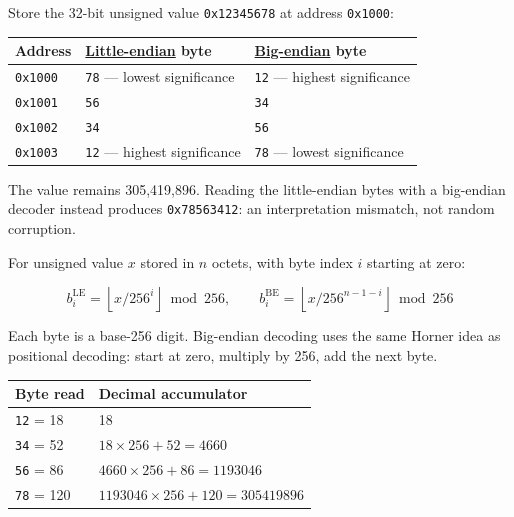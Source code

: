 Store the 32-bit unsigned value \texttt{0x12345678} at address \texttt{0x1000}:

{\def\LTcaptype{none} %
\begin{longtable}[]{@{}
  >{\raggedright\arraybackslash}p{}
  >{\raggedright\arraybackslash}p{}
  >{\raggedright\arraybackslash}p{}@{}}
\toprule\noalign{}
\begin{minipage}[b]{\linewidth}\raggedright
Address
\end{minipage} & \begin{minipage}[b]{\linewidth}\raggedright
\hyperref[appendix-367b6abf460e]{Little-endian} byte
\end{minipage} & \begin{minipage}[b]{\linewidth}\raggedright
\hyperref[appendix-92e040df969a]{Big-endian} byte
\end{minipage} \\
\midrule\noalign{}
\endhead
\bottomrule\noalign{}
\endlastfoot
\texttt{0x1000} & \texttt{78} --- lowest significance & \texttt{12} --- highest significance \\
\texttt{0x1001} & \texttt{56} & \texttt{34} \\
\texttt{0x1002} & \texttt{34} & \texttt{56} \\
\texttt{0x1003} & \texttt{12} --- highest significance & \texttt{78} --- lowest significance \\
\end{longtable}
}

The value remains 305,419,896. Reading the little-endian bytes with a big-endian decoder instead produces \texttt{0x78563412}: an interpretation mismatch, not random corruption.

For unsigned value \(x\) stored in \(n\) octets, with byte index \(i\) starting at zero:

\[
b_i^{\mathrm{LE}}=\left\lfloor x/256^i\right\rfloor\bmod256,\qquad
b_i^{\mathrm{BE}}=\left\lfloor x/256^{n-1-i}\right\rfloor\bmod256
\]

Each byte is a base-256 digit. Big-endian decoding uses the same Horner idea as positional decoding: start at zero, multiply by 256, add the next byte.

{\def\LTcaptype{none} %
\begin{longtable}[]{@{}ll@{}}
\toprule\noalign{}
Byte read & Decimal accumulator \\
\midrule\noalign{}
\endhead
\bottomrule\noalign{}
\endlastfoot
\texttt{12} = 18 & 18 \\
\texttt{34} = 52 & \(18\times256+52=4660\) \\
\texttt{56} = 86 & \(4660\times256+86=1193046\) \\
\texttt{78} = 120 & \(1193046\times256+120=305419896\) \\
\end{longtable}
}

